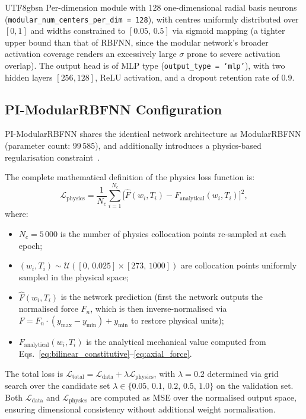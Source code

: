\documentclass[a4paper,12pt]{report}
\newcommand{\Ldata}{\mathcal{L}_{\text{data}}}
\newcommand{\Lphys}{\mathcal{L}_{\text{physics}}}
\newcommand{\Ltotal}{\mathcal{L}_{\text{total}}}
\begin{document}
\begin{CJK}{UTF8}{gbsn}
Per-dimension module with 128 one-dimensional radial basis neurons
(\texttt{modular\_num\_centers\_per\_dim = 128}), with centres uniformly distributed
over $[0,1]$ and widths constrained to $[0.05,\,0.5]$ via sigmoid mapping (a tighter
upper bound than that of RBFNN, since the modular network's broader activation coverage
renders an excessively large $\sigma$ prone to severe activation overlap). The output
head is of MLP type (\texttt{output\_type = `mlp'}), with two hidden layers $[256,128]$,
ReLU activation, and a dropout retention rate of 0.9.

\subsection{PI-ModularRBFNN Configuration}
\label{subsec:pi_config}

PI-ModularRBFNN shares the identical network architecture as ModularRBFNN
(parameter count: 99\,585), and additionally introduces a physics-based
regularisation constraint~\cite{raissi2019,haghighat2021physics}.

The complete mathematical definition of the physics loss function is:
\begin{equation}
  \Lphys = \frac{1}{N_c} \sum_{i=1}^{N_c}
    \bigl[\hat{F}(w_i, T_i) - F_{\text{analytical}}(w_i, T_i)\bigr]^2,
  \label{eq:physics_loss}
\end{equation}
where:
\begin{itemize}
  \item $N_c = 5\,000$ is the number of physics collocation points re-sampled at each
    epoch;
  \item $(w_i, T_i) \sim \mathcal{U}([0,\,0.025] \times [273,\,1000])$ are collocation
    points uniformly sampled in the physical space;
  \item $\hat{F}(w_i, T_i)$ is the network prediction (first the network outputs the
    normalised force $F_n$, which is then inverse-normalised via
    $F = F_n \cdot (y_{\max} - y_{\min}) + y_{\min}$ to restore physical units);
  \item $F_{\text{analytical}}(w_i, T_i)$ is the analytical mechanical value computed
    from Eqs.~\eqref{eq:bilinear_constitutive}--\eqref{eq:axial_force}.
\end{itemize}
The total loss is $\Ltotal = \Ldata + \lambda \Lphys$, with $\lambda = 0.2$ determined
via grid search over the candidate set $\lambda \in \{0.05,\,0.1,\,0.2,\,0.5,\,1.0\}$
on the validation set. Both $\Ldata$ and $\Lphys$ are computed as MSE over the normalised
output space, ensuring dimensional consistency without additional weight normalisation.


\end{CJK}
\end{document}
